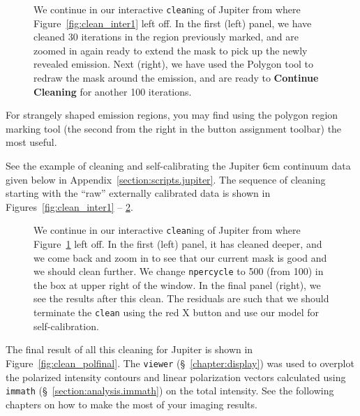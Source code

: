 \begin{figure}[h!]
\begin{center}
\caption{\label{fig:clean_inter2} We continue in our interactive 
{\tt clean}ing of Jupiter from where Figure~\ref{fig:clean_inter1}
left off.  In the first (left) panel, we have cleaned 30 iterations
in the region previously marked, and are zoomed in again ready to
extend the mask to pick up the newly revealed emission. 
Next (right), we have used the Polygon
tool to redraw the mask around the emission, and are ready to 
{\bf Continue Cleaning} for another 100 iterations.} 
\hrulefill
\end{center}
\end{figure}

For strangely shaped emission regions, you may find using the polygon
region marking tool (the second from the right in the button
assignment toolbar) the most useful.

See the example of cleaning and self-calibrating the Jupiter 6cm continuum
data given below in Appendix~\ref{section:scripts.jupiter}.  
The sequence of cleaning starting with the ``raw'' externally
calibrated data is shown in
Figures~\ref{fig:clean_inter1} -- \ref{fig:clean_inter3}.

\begin{figure}[h!]
\begin{center}
\caption{\label{fig:clean_inter3} We continue in our interactive 
{\tt clean}ing of Jupiter from where Figure~\ref{fig:clean_inter2}
left off.  In the first (left) panel,  it has cleaned deeper, and
we come back and zoom in to see that our current mask is good and
we should clean further.  We change {\tt npercycle} to 500 (from 100)
in the box at upper right of the window.  In the final panel (right),
we see the results after this clean.  The residuals are such that we
should terminate the {\tt clean} using the red X button 
and use our model for self-calibration.} 
\hrulefill
\end{center}
\end{figure}

The final result of all this cleaning for Jupiter is shown in
Figure~\ref{fig:clean_polfinal}.  The {\tt viewer} 
(\S~\ref{chapter:display}) was used to overplot the polarized
intensity contours and linear polarization vectors calculated using
{\tt immath} (\S~\ref{section:analysis.immath}) on the total
intensity.  See the following chapters on how to make the most of
your imaging results.

